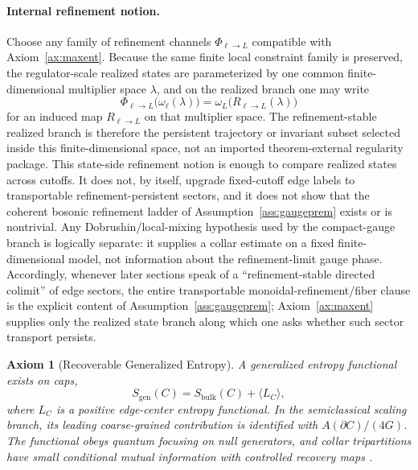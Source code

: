 \documentclass[11pt]{article}
\newtheorem{axiom}[theorem]{Axiom}
\begin{document}
\paragraph{Internal refinement notion.}
Choose any family of refinement channels \(\Phi_{\ell\to L}\) compatible with Axiom~\ref{ax:maxent}. Because the same finite local constraint family is preserved, the regulator-scale realized states are parameterized by one common finite-dimensional multiplier space \(\lambda\), and on the realized branch one may write
\[
\Phi_{\ell\to L}\bigl(\omega_{\ell}(\lambda)\bigr)
=
\omega_{L}\!\bigl(R_{\ell\to L}(\lambda)\bigr)
\]
for an induced map \(R_{\ell\to L}\) on that multiplier space. The refinement-stable realized branch is therefore the persistent trajectory or invariant subset selected inside this finite-dimensional space, not an imported theorem-external regularity package. This state-side refinement notion is enough to compare realized states across cutoffs. It does not, by itself, upgrade fixed-cutoff edge labels to transportable refinement-persistent sectors, and it does not show that the coherent bosonic refinement ladder of Assumption~\ref{ass:gaugeprem} exists or is nontrivial. Any Dobrushin/local-mixing hypothesis used by the compact-gauge branch is logically separate: it supplies a collar estimate on a fixed finite-dimensional model, not information about the refinement-limit gauge phase. Accordingly, whenever later sections speak of a ``refinement-stable directed colimit'' of edge sectors, the entire transportable monoidal-refinement/fiber clause is the explicit content of Assumption~\ref{ass:gaugeprem}; Axiom~\ref{ax:maxent} supplies only the realized state branch along which one asks whether such sector transport persists.

\begin{axiom}[Recoverable Generalized Entropy]\label{ax:entropy}
A generalized entropy functional exists on caps,
\[
S_{\mathrm{gen}}(C)=S_{\mathrm{bulk}}(C)+\langle L_C\rangle,
\]
where \(L_C\) is a positive edge-center entropy functional. In the semiclassical scaling branch, its leading coarse-grained contribution is identified with \(A(\partial C)/(4G)\). The functional obeys quantum focusing on null generators, and collar tripartitions have small conditional mutual information with controlled recovery maps \cite{liebRuskai73,petz86,petz88,fawziRenner15}.
\end{axiom}
\end{document}
